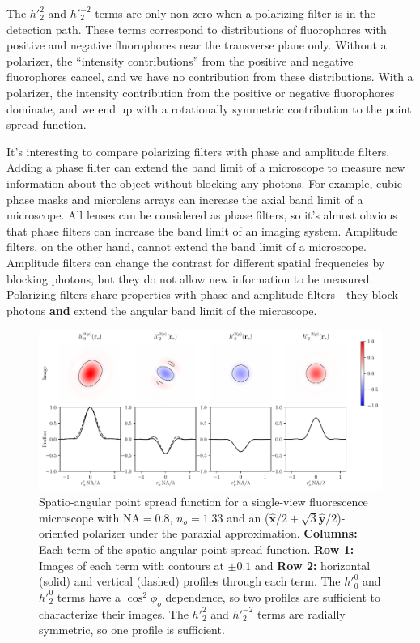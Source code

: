 \documentclass[11pt]{article}
\providecommand{\mh}[1]{\mathbf{\hat{#1}}}
\begin{document}
The ${h'}_2^2$ and ${h'}_2^{-2}$ terms are only non-zero when a polarizing
filter is in the detection path. These terms correspond to distributions of
fluorophores with positive and negative fluorophores near the transverse plane
only. Without a polarizer, the ``intensity contributions'' from the positive and
negative fluorophores cancel, and we have no contribution from these
distributions. With a polarizer, the intensity contribution from the positive or
negative fluorophores dominate, and we end up with a rotationally symmetric
contribution to the point spread function.  

It's interesting to compare polarizing filters with phase and amplitude filters.
Adding a phase filter can extend the band limit of a microscope to measure new
information about the object without blocking any photons. For example, cubic
phase masks and microlens arrays can increase the axial band limit of a
microscope. All lenses can be considered as phase filters, so it's almost
obvious that phase filters can increase the band limit of an imaging system.
Amplitude filters, on the other hand, cannot extend the band limit of a
microscope. Amplitude filters can change the contrast for different spatial
frequencies by blocking photons, but they do not allow new information to be
measured. Polarizing filters share properties with phase and amplitude
filters---they block photons \textbf{and} extend the angular band limit of the
microscope. 

\begin{figure}[ht]
 \captionsetup{width=1.0\linewidth}
 \centering
   \centering
   \includegraphics[width = 1.\textwidth]{../calculations/psfsp3.pdf}
   \caption{Spatio-angular point spread function for a single-view fluorescence
     microscope with $\text{NA}=0.8$, $n_o=1.33$ and an
     ($\mh{x}/2 + \sqrt{3}\mh{y}/2$)-oriented polarizer under the paraxial
     approximation. \textbf{Columns:} Each term of the spatio-angular point
     spread function. \textbf{Row 1:} Images of each term with contours at
     $\pm 0.1$ and \textbf{Row 2:} horizontal (solid) and vertical (dashed)
     profiles through each term. The ${h'}_0^0$ and ${h'}_2^0$ terms have a
     $\cos^2\phi_o$ dependence, so two profiles are sufficient to characterize
     their images. The ${h'}_2^2$ and ${h'}_2^{-2}$ terms are radially
     symmetric, so one profile is sufficient.}
   \label{fig:psf2}
\end{figure}
\end{document}
